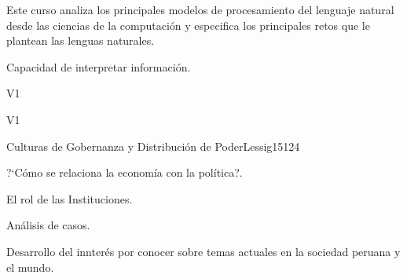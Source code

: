 \begin{syllabus}


\begin{justification}
Este curso analiza los principales modelos de procesamiento del lenguaje natural desde las ciencias de la computación y especifica los principales retos que le plantean las lenguas naturales.
\end{justification}

\begin{goals}
\item Capacidad de interpretar información.
\end{goals}

\begin{outcomes}{V1}
    \item {}
    \item {}
    \item {}
    
\end{outcomes}

\begin{competences}{V1}
    \item {}
    \item {}
    \item {}
    \item {}
\end{competences}

\begin{unit}{Culturas de Gobernanza y Distribución de Poder}{}{Lessig15}{12}{4}
   \begin{topics}
      \item ?`Cómo se relaciona la economía con la política?.
      \item El rol de las Instituciones.
      \item Análisis de casos.
   \end{topics}
   \begin{learningoutcomes}
      \item Desarrollo del innterés por conocer sobre temas actuales en la sociedad peruana y el mundo.
   \end{learningoutcomes}
\end{unit}

\begin{coursebibliography}
\end{coursebibliography}

\end{syllabus}
